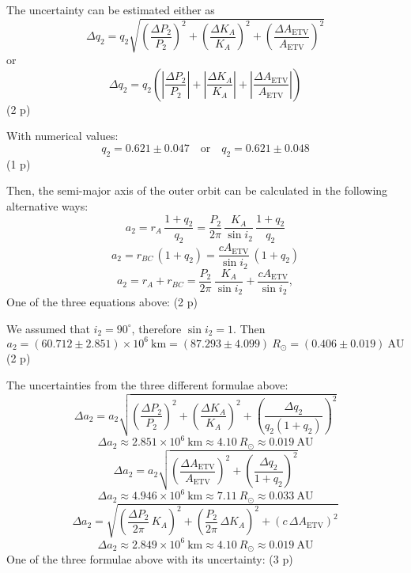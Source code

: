 \begin{description}
  The uncertainty can be estimated either as
  \[ \Delta q_2 = q_2 \sqrt{
       \left( \frac{\Delta P_2}{P_2} \right)^2
       + \left( \frac{\Delta K_A}{K_A} \right)^2
       + \left( \frac{\Delta A_{\mathrm{ETV}}}{A_{\mathrm{ETV}}} \right)^2 }
     \tag*{(2.38)} \]
  or
  \[ \Delta q_2 = q_2 \left(
       \left| \frac{\Delta P_2}{P_2} \right|
       + \left| \frac{\Delta K_A}{K_A} \right|
       + \left| \frac{\Delta A_{\mathrm{ETV}}}{A_{\mathrm{ETV}}} \right|
       \right)
     \tag*{(2.39)} \]
  \hfill(2 p)

  With numerical values:
  \[ q_2 = 0.621 \pm 0.047 \quad\text{or}\quad q_2 = 0.621 \pm 0.048 \]
  \hfill(1 p)

  Then, the semi-major axis of the outer orbit can be calculated in the
  following alternative ways:
  \[ a_2 = r_A\,\frac{1 + q_2}{q_2}
     = \frac{P_2}{2\pi}\,\frac{K_A}{\sin i_2}\,\frac{1 + q_2}{q_2}
     \tag*{(2.40)} \]
  \[ a_2 = r_{BC}\,(1 + q_2)
     = \frac{c A_{\mathrm{ETV}}}{\sin i_2}\,(1 + q_2)
     \tag*{(2.41)} \]
  \[ a_2 = r_A + r_{BC}
     = \frac{P_2}{2\pi}\,\frac{K_A}{\sin i_2}
     + \frac{c A_{\mathrm{ETV}}}{\sin i_2},
     \tag*{(2.42)} \]
  One of the three equations above: \hfill(2 p)

  We assumed that $i_2 = 90^\circ$, therefore $\sin i_2 = 1$. Then
  \[ a_2 = (60.712 \pm 2.851) \times 10^6\ \mathrm{km}
     = (87.293 \pm 4.099)\ R_\odot
     = (0.406 \pm 0.019)\ \mathrm{AU} \]
  \hfill(2 p)

  The uncertainties from the three different formulae above:
  \[ \Delta a_2 = a_2 \sqrt{
       \left( \frac{\Delta P_2}{P_2} \right)^2
       + \left( \frac{\Delta K_A}{K_A} \right)^2
       + \left( \frac{\Delta q_2}{q_2 (1 + q_2)} \right)^2 }
     \tag*{(2.43)} \]
  \[ \Delta a_2 \approx 2.851 \times 10^6\ \mathrm{km}
     \approx 4.10\ R_\odot \approx 0.019\ \mathrm{AU} \]
  \[ \Delta a_2 = a_2 \sqrt{
       \left( \frac{\Delta A_{\mathrm{ETV}}}{A_{\mathrm{ETV}}} \right)^2
       + \left( \frac{\Delta q_2}{1 + q_2} \right)^2 }
     \tag*{(2.44)} \]
  \[ \Delta a_2 \approx 4.946 \times 10^6\ \mathrm{km}
     \approx 7.11\ R_\odot \approx 0.033\ \mathrm{AU} \]
  \[ \Delta a_2 = \sqrt{
       \left( \frac{\Delta P_2}{2\pi}\,K_A \right)^2
       + \left( \frac{P_2}{2\pi}\,\Delta K_A \right)^2
       + \left( c\,\Delta A_{\mathrm{ETV}} \right)^2 }
     \tag*{(2.45)} \]
  \[ \Delta a_2 \approx 2.849 \times 10^6\ \mathrm{km}
     \approx 4.10\ R_\odot \approx 0.019\ \mathrm{AU} \]
  One of the three formulae above with its uncertainty: \hfill(3 p)


\end{description}
